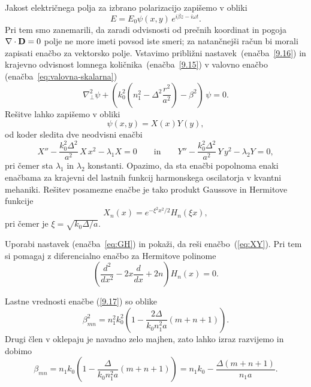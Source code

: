 Jakost električnega polja za izbrano polarizacijo zapišemo v obliki 
\begin{equation}
E=E_{0}\psi(x,y)\, e^{i\beta z-i\omega t}.
\label{9.16}
\end{equation}
Pri tem smo zanemarili, da zaradi odvisnosti od prečnih koordinat in pogoja $\nabla\cdot{\bf D}=0$
polje ne more imeti povsod iste smeri; za natančnejši račun bi morali zapisati enačbo za
vektorsko polje. Vstavimo približni
nastavek~(enačba~\ref{9.16}) in krajevno odvisnost lomnega količnika~(enačba~\ref{9.15})
v valovno enačbo (enačba~\ref{eq:valovna-skalarna}) 
\begin{equation}
\nabla_{\perp}^{2}\psi+\left(k_{0}^{2}\left(n_{1}^{2}-\Delta^{2}\frac{r^{2}}{a^2}\right)-
\beta^{2}\right)\,\psi=0.
\label{9.17}
\end{equation}
Rešitve lahko zapišemo v obliki
\begin{equation}
\psi(x,y) = X(x)Y(y),
\end{equation}
od koder sledita dve neodvisni enačbi
\begin{equation}
X'' - \frac{k_0^2 \Delta^2}{a^2}\,X\,x^2 - \lambda_1 X = 0 \qquad \mathrm{in} \qquad
Y'' - \frac{k_0^2 \Delta^2}{a^2}\,Y\,y^2 - \lambda_2 Y = 0,
\label{eq:XY}
\end{equation}
pri čemer sta $\lambda_1$ in $\lambda_2$ konstanti. 
Opazimo, da sta enačbi popolnoma enaki enačbama za krajevni del lastnih funkcij 
harmonskega oscilatorja v kvantni mehaniki.
Rešitev posamezne enačbe je tako 
produkt Gaussove in Hermitove funkcije
\begin{equation}
X_n(x) = e^{-\xi^2 x^2/2} H_n(\xi x),
\label{eq:GH}
\end{equation}
pri čemer je $\xi = \sqrt{k_0 \Delta/a}$.
\begin{definition}
Uporabi nastavek (enačba~\ref{eq:GH}) in pokaži, da reši enačbo~(\ref{eq:XY}). Pri tem si pomagaj z 
diferencialno enačbo za Hermitove polinome
\begin{equation}
\left( \frac{d^2}{dx^2}-2x\frac{d}{dx}+2n \right) H_n(x) = 0.
\end{equation}
\end{definition}
Lastne vrednosti enačbe (\ref{9.17}) so oblike
\begin{equation}
\beta_{mn}^{2}=n_{1}^{2}k_{0}^{2}\left(1-\frac{2\Delta}{k_{0}n_{1}^2a}\left(m+n+1\right)\right)\!.
\label{9.19}
\end{equation}
Drugi člen v oklepaju je navadno zelo majhen, zato lahko izraz razvijemo in dobimo
\begin{equation}
\beta_{mn}=n_{1}k_{0}\left(1-\frac{\Delta}{k_{0}n_{1}^2 a}\left(m+n+1\right)\right)
= n_{1}k_{0} - \frac{\Delta \left(m+n+1\right)}{n_{1} a}.
\end{equation}

